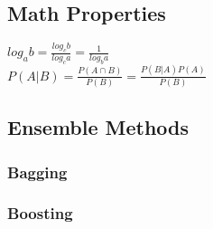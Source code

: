 \documentclass{article}
\author{Ian Chen}
\date{\today}
\begin{document}
    \begin{multicols*}{2}
        \subsection*{Math Properties}
        $log_a b = \frac{log_c b}{log_c a} = \frac{1}{log_b a}$\\
        $P(A|B) = \frac{P(A \cap B)}{P(B)} = \frac{P(B|A)P(A)}{P(B)}$\\
        \subsection*{Ensemble Methods}
        \subsubsection*{Bagging}
        \subsubsection*{Boosting}
    \end{multicols*}
\end{document}
